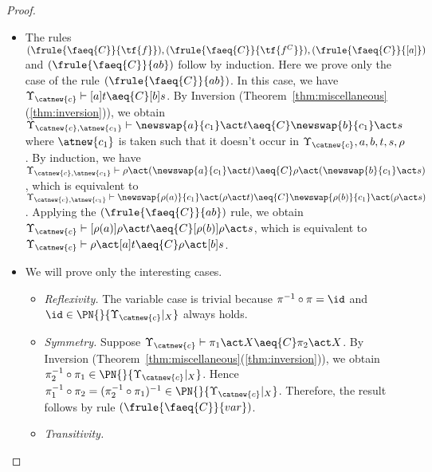 \begin{proof}
\begin{enumerate}
\begin{itemize}
            \item The rules $(\frule{\faeq{C}}{\tf{f}}),(\frule{\faeq{C}}{\tf{f^C}}), (\frule{\faeq{C}}{[a]})$ and $(\frule{\faeq{C}}{ab})$ follow by induction. Here we prove only the case of the rule $(\frule{\faeq{C}}{ab})$. In this case, we have $\Upsilon_{\catnew{c}} \vdash [a]t \aeq{C} [b]s$. By Inversion (Theorem~\ref{thm:miscellaneous}(\ref{thm:inversion})), we obtain $\Upsilon_{\catnew{c},\atnew{c_1}} \vdash  \newswap{a}{c_1}\act t \aeq{C} \newswap{b}{c_1}\act s$ where $\atnew{c_1}$ is taken such that it doesn't occur in $\Upsilon_{\catnew{c}},a,b,t,s,\rho$. By induction, we have $\Upsilon_{\catnew{c},\atnew{c_1}} \vdash  \rho\act(\newswap{a}{c_1}\act t) \aeq{C} \rho\act(\newswap{b}{c_1}\act s)$, which is equivalent to $\Upsilon_{\catnew{c},\atnew{c_1}}  \vdash \newswap{\rho(a)}{c_1}\act (\rho\act t) \aeq{C} \newswap{\rho(b)}{c_1}\act (\rho\act s)$. Applying the $(\frule{\faeq{C}}{ab})$ rule, we obtain $\Upsilon_{\catnew{c}}  \vdash [\rho(a)]\rho\act t \aeq{C} [\rho(b)]\rho\act s$, which is equivalent to $\Upsilon_{\catnew{c}}  \vdash \rho\act[a]t \aeq{C} \rho\act[b]s$.

            \item  We will prove only the interesting cases.
    \begin{itemize}
        \item {\it Reflexivity.} The variable case is trivial because $\pi^{-1}\circ\pi = \id$ and $\id \in \PN{}{\Upsilon_{\catnew{c}}|_X}$ always holds.

        \item {\it Symmetry.} Suppose $\Upsilon_{\catnew{c}} \vdash \pi_1\act X \aeq{C} \pi_2\act X$. By Inversion (Theorem~\ref{thm:miscellaneous}(\ref{thm:inversion})), we obtain $\pi_2^{-1}\circ\pi_1 \in \PN{}{\Upsilon_{\catnew{c}}|_X}$. Hence $\pi_1^{-1}\circ \pi_2 = (\pi_2^{-1}\circ\pi_1)^{-1} \in  \PN{}{\Upsilon_{\catnew{c}}|_X}$. Therefore, the result follows by rule $(\frule{\faeq{C}}{var})$.

        \item {\it Transitivity.}


\end{itemize}
\end{itemize}
\end{enumerate}
\end{proof}
